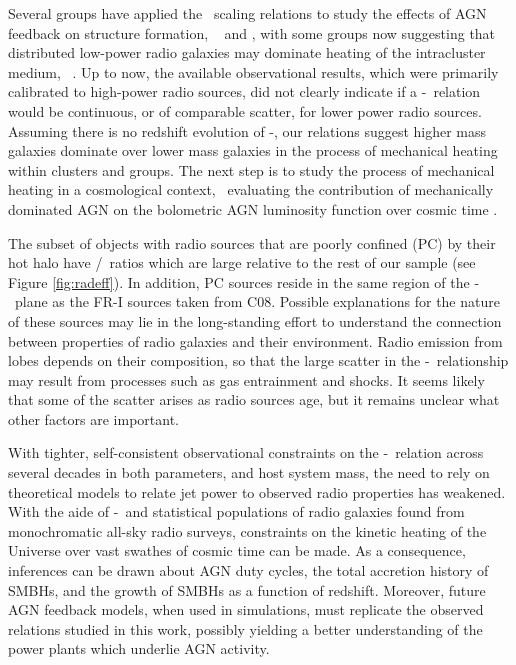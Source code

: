 \documentclass{emulateapj}
\begin{document}
Several groups have applied the \birzan\ scaling relations to study
the effects of AGN feedback on structure formation,
\eg\ \citet{best07} and \citet{2007MNRAS.379..260M}, with some groups
now suggesting that distributed low-power radio galaxies may dominate
heating of the intracluster medium,
\eg\ \citet{2009ApJ...705..854H}. Up to now, the available
observational results, which were primarily calibrated to high-power
radio sources, did not clearly indicate if a \pjet-\prad\ relation
would be continuous, or of comparable scatter, for lower power radio
sources. Assuming there is no redshift evolution of \pjet-\prad, our
relations suggest higher mass galaxies dominate over lower mass
galaxies in the process of mechanical heating within clusters and
groups. The next step is to study the process of mechanical heating in
a cosmological context, \eg\ evaluating the contribution of
mechanically dominated AGN on the bolometric AGN luminosity function
over cosmic time \citep[\ie][]{2009MNRAS.395..518C}.

The subset of objects with radio sources that are poorly confined (PC)
by their hot halo have \pjet/\prad\ ratios which are large relative to
the rest of our sample (see Figure \ref{fig:radeff}). In addition, PC
sources reside in the same region of the \pjet-\prad\ plane as the
FR-I sources taken from C08. Possible explanations for the nature of
these sources may lie in the long-standing effort to understand the
connection between properties of radio galaxies and their
environment. Radio emission from lobes depends on their composition,
so that the large scatter in the \pjet-\prad\ relationship may result
from processes such as gas entrainment and shocks. It seems likely
that some of the scatter arises as radio sources age, but it remains
unclear what other factors are important.

With tighter, self-consistent observational constraints on the
\pjet-\prad\ relation across several decades in both parameters, and
host system mass, the need to rely on theoretical models to relate jet
power to observed radio properties has weakened. With the aide of
\pjet-\prad\ and statistical populations of radio galaxies found from
monochromatic all-sky radio surveys, constraints on the kinetic
heating of the Universe over vast swathes of cosmic time can be made.
As a consequence, inferences can be drawn about AGN duty cycles, the
total accretion history of SMBHs, and the growth of SMBHs as a
function of redshift. Moreover, future AGN feedback models, when used
in simulations, must replicate the observed relations studied in this
work, possibly yielding a better understanding of the power plants
which underlie AGN activity.
\end{document}
